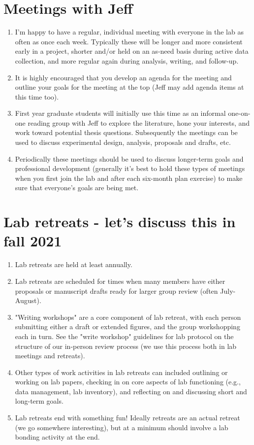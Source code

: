 \documentclass[12pt]{article}
\begin{document}
\section{Meetings with Jeff}
\begin{enumerate}
\item I'm happy to have a regular, individual meeting with everyone in the lab as often as once each week. Typically these will be longer and more consistent early in a project, shorter and/or held on an as-need basis during active data collection, and more regular again during analysis, writing, and follow-up.
\item It is highly encouraged that you develop an agenda for the meeting and outline your goals for the meeting at the top (Jeff may add agenda items at this time too). 
\item First year graduate students will initially use this time as an informal one-on-one reading group with Jeff to explore the literature, hone your interests, and work toward potential thesis questions. Subsequently the meetings can be used to discuss experimental design, analysis, proposals and drafts, etc. 
\item Periodically these meetings should be used to discuss longer-term goals and professional development (generally it's best to hold these types of meetings when you first join the lab and after each six-month plan exercise) to make sure that everyone's goals are being met.
  \end{enumerate}

\section{Lab retreats - let's discuss this in fall 2021}
\begin{enumerate}
\item Lab retreats are held at least annually.
\item Lab retreats are scheduled for times when many members have either proposals or manuscript drafts ready for larger group review (often July-August).
\item "Writing workshops" are a core component of lab retreat, with each person submitting either a draft or extended figures, and the group workshopping each in turn. See the "write workshop" guidelines for lab protocol on the structure of our in-person review process (we use this process both in lab meetings and retreats).
\item Other types of work activities in lab retreats can included outlining or working on lab papers, checking in on core aspects of lab functioning (e.g., data management, lab inventory), and reflecting on and discussing short and long-term goals. 
\item Lab retreats end with something fun! Ideally retreats are an actual retreat (we go somewhere interesting), but at a minimum should involve a lab bonding activity at the end.
\end{enumerate}
\end{document}
